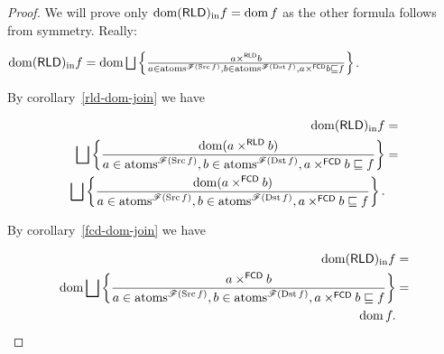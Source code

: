 \begin{proof}
We will prove only $\dom\torldin f=\dom f$ as the other formula follows
from symmetry. Really:

$\dom\torldin f=\dom\bigsqcup\setcond{a\times^{\mathsf{RLD}}b}{a\in\atoms^{\mathscr{F}(\Src f)},b\in\atoms^{\mathscr{F}(\Dst f)},a\times^{\mathsf{FCD}}b\sqsubseteq f}$.

By corollary~\ref{rld-dom-join} we have

\begin{align*}
\dom\torldin f & =\\
\bigsqcup\setcond{\dom(a\times^{\mathsf{RLD}}b)}{a\in\atoms^{\mathscr{F}(\Src f)},b\in\atoms^{\mathscr{F}(\Dst f)},a\times^{\mathsf{FCD}}b\sqsubseteq f} & =\\
\bigsqcup\setcond{\dom(a\times^{\mathsf{FCD}}b)}{a\in\atoms^{\mathscr{F}(\Src f)},b\in\atoms^{\mathscr{F}(\Dst f)},a\times^{\mathsf{FCD}}b\sqsubseteq f}.
\end{align*}


By corollary~\ref{fcd-dom-join} we have

\begin{align*}
\dom\torldin f & =\\
\dom\bigsqcup\setcond{a\times^{\mathsf{FCD}}b}{a\in\atoms^{\mathscr{F}(\Src f)},b\in\atoms^{\mathscr{F}(\Dst f)},a\times^{\mathsf{FCD}}b\sqsubseteq f} & =\\
\dom f.
\end{align*}
\end{proof}


